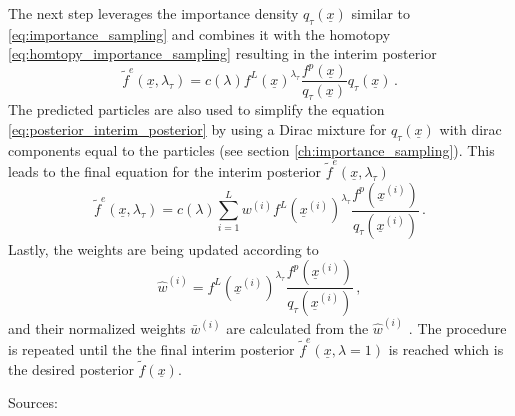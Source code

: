 \documentclass[a4paper]{IEEEtran}
\begin{document}
The next step leverages the importance density $q_{\tau}(\underline{x})$ similar to \eqref{eq:importance_sampling} and
combines it with the homotopy \eqref{eq:homtopy_importance_sampling} resulting in the interim posterior
\begin{equation}
    \tilde{f}^{e}(\underline{x}, \lambda_{\tau}) = c(\lambda)f^L(\underline{x})^{\lambda_{\tau}}\frac{f^p(\underline{x})}{q_{\tau}(\underline{x})}q_{\tau}(\underline{x}) \,.
    \label{eq:posterior_interim_posterior}
\end{equation}
The predicted particles are also used to simplify the equation \eqref{eq:posterior_interim_posterior} by using a Dirac mixture for $q_{\tau}(\underline{x})$ with dirac components equal to the particles (see section \ref{ch:importance_sampling}).
This leads to the final equation for the interim posterior $\tilde{f}^{e}(\underline{x}, \lambda_{\tau})$
\begin{equation}
    \tilde{f}^{e}(\underline{x}, \lambda_{\tau}) = c(\lambda) \sum_{i=1}^{L}w^{(i)}f^L(\underline{x}^{(i)})^{\lambda_{\tau}}\frac{f^p(\underline{x}^{(i)})}{q_{\tau}(\underline{x}^{(i)})} \,.
    \label{eq:posterior_interim_posterior2}
\end{equation}
Lastly, the weights are being updated according to
\begin{equation}
    \hat{w}^{(i)}= f^L(\underline{x}^{(i)})^{\lambda_{\tau}}\frac{f^p(\underline{x}^{(i)})}{q_{\tau}(\underline{x}^{(i)})} \,,
    \label{eq:posterior_update_weights}
\end{equation}
and their normalized weights $\bar{w}^{(i)}$ are calculated from the $\hat{w}^{(i)}$ \cite{chlebek2016a}.
The procedure is repeated until the the final interim posterior $\tilde{f}^{e}(\underline{x}, \lambda=1)$ is reached which is the desired posterior $\tilde{f}(\underline{x})$.

Sources:
\cite{chen2003}


\end{document}
